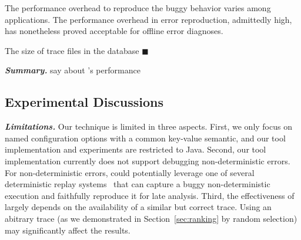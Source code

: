 The performance overhead to reproduce the buggy behavior varies
among applications.
The performance overhead in error reproduction,
admittedly high, has nonetheless proved acceptable
for offline error diagnoses.

The size of trace files in the database $\blacksquare$




\vspace{1mm}
\noindent \textbf{\textit{Summary.}} say about \ourtool's performance

\vspace{1mm}

\subsection{Experimental Discussions}


\noindent \textbf{\textit{Limitations.}} 
Our technique is limited in three aspects.
First, we only focus on named configuration options
with a common key-value semantic, and our tool implementation
and experiments are
restricted to Java. 
Second,  our tool implementation currently does not
support debugging non-deterministic errors. 
For non-deterministic errors, \ourtool could potentially leverage one of
several deterministic replay systems~\cite{Huang:2010:LLD}
that can capture a buggy non-deterministic
execution and faithfully reproduce it for late analysis.
Third, the effectiveness of \ourtool largely
depends on the availability of a similar but correct trace.
Using an abitrary trace (as we demonstrated in Section~\ref{sec:ranking}
by random selection) may significantly affect the results.







\vspace{1mm}

